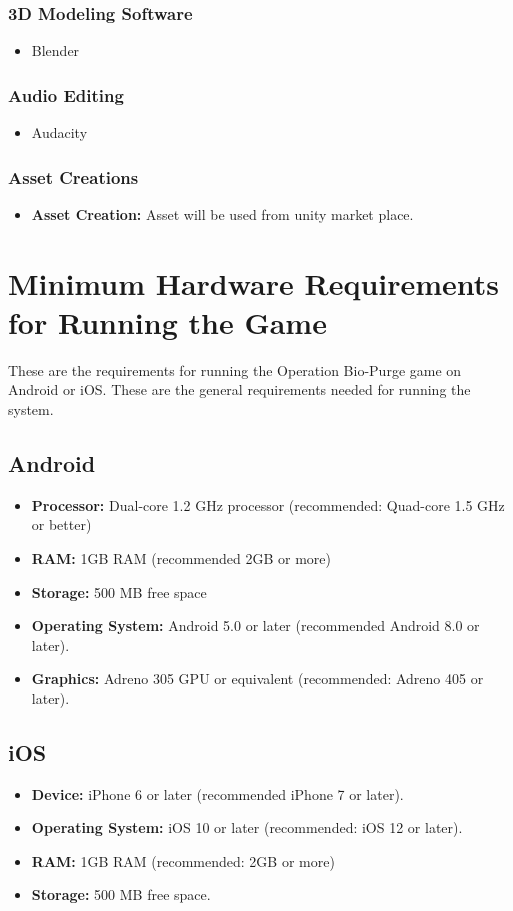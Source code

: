 \subsubsection{3D Modeling Software}
\begin{itemize}
\item	Blender
\end{itemize}
\subsubsection{Audio Editing}
\begin{itemize}
	\item Audacity
\end{itemize}
\subsubsection{Asset Creations}
\begin{itemize}
	\item \textbf{Asset Creation:} Asset will be used from unity market place.
\end{itemize}

\section{Minimum Hardware Requirements for Running the Game}
These are the requirements for running the Operation Bio-Purge game on Android or iOS. These are the general requirements needed for running the system.
\subsection{Android}
\begin{itemize}
	\item \textbf{Processor:} Dual-core 1.2 GHz processor (recommended: Quad-core 1.5 GHz or better)
	\item \textbf{RAM:} 1GB RAM (recommended 2GB or more)
	\item \textbf{Storage:} 500 MB free space 
	\item \textbf{Operating System:} Android 5.0 or later (recommended Android 8.0 or later).
	\item \textbf{Graphics:} Adreno 305 GPU or equivalent (recommended: Adreno 405 or later).
\end{itemize}
\subsection{iOS}
\begin{itemize}
	\item \textbf{Device:}	 iPhone 6 or later (recommended iPhone 7 or later).
	\item \textbf{Operating System:}  iOS 10 or later (recommended: iOS 12 or later).
	\item \textbf{RAM:} 1GB RAM (recommended: 2GB or more)
	\item \textbf{Storage:} 500 MB free space.	
\end{itemize}